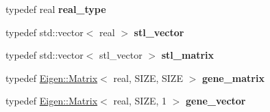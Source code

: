 \begin{DoxyCompactItemize}
\mbox{\label{classeigen2__interface_a6f1b17cf35a7e234f1efe8cba3df654a}} 
typedef real {\bfseries real\+\_\+type}
\item 
\mbox{\label{classeigen2__interface_a841d65dabee79471dad82cd2c55b1301}} 
typedef std\+::vector$<$ real $>$ {\bfseries stl\+\_\+vector}
\item 
\mbox{\label{classeigen2__interface_a879808f0d89360f35d52b489e0c9f3c6}} 
typedef std\+::vector$<$ stl\+\_\+vector $>$ {\bfseries stl\+\_\+matrix}
\item 
\mbox{\label{classeigen2__interface_ab25bad0d468705f8b44485b542476370}} 
typedef \hyperlink{group___core___module_class_eigen_1_1_matrix}{Eigen\+::\+Matrix}$<$ real, S\+I\+ZE, S\+I\+ZE $>$ {\bfseries gene\+\_\+matrix}
\item 
\mbox{\label{classeigen2__interface_aca955ca62710bc55f92ca70e2841cb25}} 
typedef \hyperlink{group___core___module_class_eigen_1_1_matrix}{Eigen\+::\+Matrix}$<$ real, S\+I\+ZE, 1 $>$ {\bfseries gene\+\_\+vector}
\end{DoxyCompactItemize}
